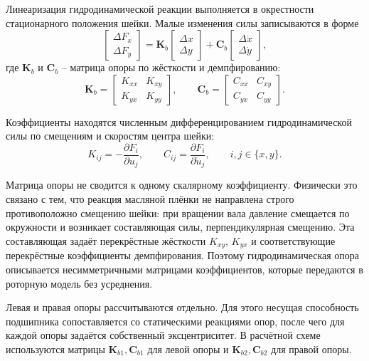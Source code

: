 \documentclass[14pt,a4paper]{extarticle}
\numberwithin{equation}{section}
\numberwithin{figure}{section}
\numberwithin{table}{section}
\begin{document}
Линеаризация гидродинамической реакции выполняется в окрестности стационарного положения шейки. Малые изменения силы записываются в форме
\begin{equation}
    \begin{bmatrix}\Delta F_x\\ \Delta F_y\end{bmatrix}=
    \mathbf{K}_b
    \begin{bmatrix}\Delta x\\ \Delta y\end{bmatrix}+
    \mathbf{C}_b
    \begin{bmatrix}\Delta \dot{x}\\ \Delta \dot{y}\end{bmatrix},
    \label{eq:bearing_linear_force}
\end{equation}
где $\mathbf{K}_b$ и $\mathbf{C}_b$ -- матрица опоры по жёсткости и демпфированию:
\begin{equation}
    \mathbf{K}_b=\begin{bmatrix}K_{xx}&K_{xy}\\K_{yx}&K_{yy}\end{bmatrix},\qquad
    \mathbf{C}_b=\begin{bmatrix}C_{xx}&C_{xy}\\C_{yx}&C_{yy}\end{bmatrix}.
    \label{eq:bearing_matrices}
\end{equation}

Коэффициенты находятся численным дифференцированием гидродинамической силы по смещениям и скоростям центра шейки:
\begin{equation}
    K_{ij}=-\frac{\partial F_i}{\partial u_j},\qquad
    C_{ij}=\frac{\partial F_i}{\partial \dot{u}_j},\qquad i,j\in\{x,y\}.
    \label{eq:coefficients_derivatives}
\end{equation}

Матрица опоры не сводится к одному скалярному коэффициенту. Физически это связано с тем, что реакция масляной плёнки не направлена строго противоположно смещению шейки: при вращении вала давление смещается по окружности и возникает составляющая силы, перпендикулярная смещению. Эта составляющая задаёт перекрёстные жёсткости $K_{xy}$, $K_{yx}$ и соответствующие перекрёстные коэффициенты демпфирования. Поэтому гидродинамическая опора описывается несимметричными матрицами коэффициентов, которые передаются в роторную модель без усреднения.

Левая и правая опоры рассчитываются отдельно. Для этого несущая способность подшипника сопоставляется со статическими реакциями опор, после чего для каждой опоры задаётся собственный эксцентриситет. В расчётной схеме используются матрицы $\mathbf{K}_{b1},\mathbf{C}_{b1}$ для левой опоры и $\mathbf{K}_{b2},\mathbf{C}_{b2}$ для правой опоры.
\end{document}
